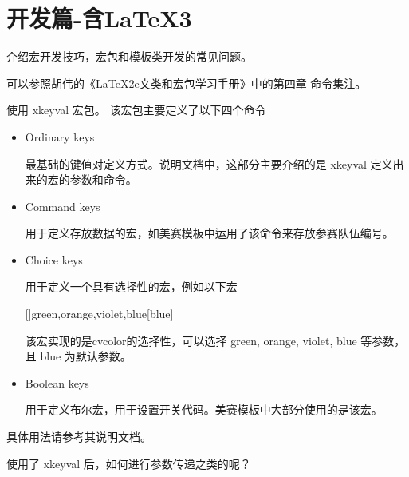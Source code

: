 
\section{开发篇-含LaTeX3}

介绍宏开发技巧，宏包和模板类开发的常见问题。



可以参照胡伟的《LaTeX2e文类和宏包学习手册》中的第四章-命令集注。



使用 xkeyval 宏包。
该宏包主要定义了以下四个命令
\begin{itemize}
  \item Ordinary keys

    最基础的键值对定义方式。说明文档中，这部分主要介绍的是 xkeyval 定义出来的宏的参数和命令。

  \item Command keys

    用于定义存放数据的宏，如美赛模板中运用了该命令来存放参赛队伍编号。

  \item Choice keys

    用于定义一个具有选择性的宏，例如以下宏
\begin{texlist}
  [\val\ar]{green,orange,violet,blue}[blue]{
    \ifcase\ar\relax
    \or
    \or
    \else
    \fi
  }
\end{texlist}
  该宏实现的是cvcolor的选择性，可以选择 green, orange, violet, blue 等参数，且 blue 为默认参数。

  \item Boolean keys

    用于定义布尔宏，用于设置开关代码。美赛模板中大部分使用的是该宏。
\end{itemize}

  具体用法请参考其说明文档。

  使用了 xkeyval 后，如何进行参数传递之类的呢？
\begin{texlist}
  \ProcessOptionsX\relax
\end{texlist}

